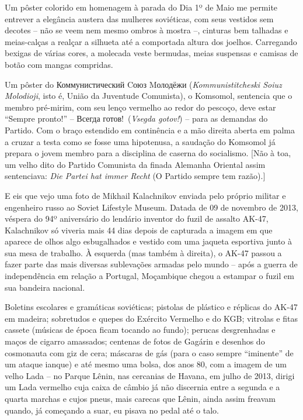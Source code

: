 Um pôster colorido em homenagem à parada do Dia 1º de Maio me permite
entrever a elegância austera das mulheres soviéticas, com seus vestidos
sem decotes -- não se veem nem mesmo ombros à mostra --, cinturas bem
talhadas e meias-calças a realçar a silhueta até a comportada altura dos
joelhos. Carregando bexigas de várias cores, a molecada veste bermudas,
meias suspensas e camisas de botão com mangas compridas.

Um pôster do Коммунистический Cоюз Mолодёжи (\emph{Kommunistitcheski
Soiuz Molodioji}, isto é, União da Juventude Comunista), o Komsomol,
sentencia que o membro pré-mirim, com seu lenço vermelho ao redor do
pescoço, deve estar ``Sempre pronto!'' -- Всегда готов!~(\emph{Vsegda
gotov!}) -- para as demandas do Partido. Com o braço estendido em
continência e a mão direita aberta em palma a cruzar a testa como se
fosse uma hipotenusa, a saudação do Komsomol já prepara o jovem membro
para a disciplina de caserna do socialismo. {[}Não à toa, um velho dito
do Partido Comunista da finada Alemanha Oriental assim sentenciava:
\emph{Die Partei hat immer Recht} (O Partido sempre tem razão).{]}

E eis que vejo uma foto de Mikhail Kalachnikov enviada pelo próprio
militar e engenheiro russo ao Soviet Lifestyle Museum. Datada de 09 de
novembro de 2013, véspera do 94º aniversário do lendário inventor do
fuzil de assalto AK-47, Kalachnikov só viveria mais 44 dias depois de
capturada a imagem em que aparece de olhos algo esbugalhados e vestido
com uma jaqueta esportiva junto à sua mesa de trabalho. À esquerda (mas
também à direita), o AK-47 passou a fazer parte das mais diversas
sublevações armadas pelo mundo -- após a guerra de independência em
relação a Portugal, Moçambique chegou a estampar o fuzil em sua bandeira
nacional.

Boletins escolares e gramáticas soviéticas; pistolas de plástico e
réplicas do AK-47 em madeira; sobretudos e quepes do Exército Vermelho e
do KGB; vitrolas e fitas cassete (músicas de época ficam tocando ao
fundo); perucas desgrenhadas e maços de cigarro amassados; centenas de
fotos de Gagárin e desenhos do cosmonauta com giz de cera; máscaras de
gás (para o caso sempre ``iminente'' de um ataque ianque) e até mesmo
uma bolsa, dos anos 80, com a imagem de um velho Lada -- no Parque
Lênin, nas cercanias de Havana, em julho de 2013, dirigi um Lada
vermelho cuja caixa de câmbio já não discernia entre a segunda e a
quarta marchas e cujos pneus, mais carecas que Lênin, ainda assim
freavam quando, já começando a suar, eu pisava no pedal até o talo.

